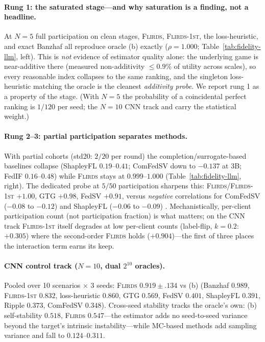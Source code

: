 \paragraph{Rung 1: the saturated stage---and why saturation is a finding, not a headline.}
At $N{=}5$ full participation on clean stages, \textsc{Flirds},
\textsc{Flirds-1st}, the loss-heuristic, and exact Banzhaf all reproduce oracle
(b) exactly ($\rho = 1.000$; Table~\ref{tab:fidelity-llm}, left). This is
\emph{not} evidence of estimator quality alone: the underlying game is
near-additive there (measured non-additivity $\le 0.9\%$ of utility across
scales), so every reasonable index collapses to the same ranking, and the
singleton loss-heuristic matching the oracle is the cleanest \emph{additivity
probe}. We report rung 1 as a property of the stage. (With $N{=}5$ the
probability of a coincidental perfect ranking is $1/120$ per seed; the $N{=}10$
CNN track and  carry the statistical
weight.)

\paragraph{Rung 2--3: partial participation separates methods.}
With partial cohorts (std20: $2/20$ per round) the completion/surrogate-based
baselines collapse (ShapleyFL $0.19$--$0.41$; ComFedSV down to $-0.137$ at 3B;
FedIF $0.16$--$0.48$) while \textsc{Flirds} stays at $0.999$--$1.000$
(Table~\ref{tab:fidelity-llm}, right). The dedicated probe at $5/50$
participation sharpens this: \textsc{Flirds}/\textsc{Flirds-1st} $+1.00$,
GTG $+0.98$, FedSV $+0.91$, versus \emph{negative} correlations for
ComFedSV ($-0.08$ to $-0.12$) and ShapleyFL ($-0.06$ to $-0.09$)
.
Mechanistically, per-client participation count (not participation fraction) is
what matters; on the CNN track \textsc{Flirds-1st} itself degrades at low
per-client counts (label-flip, $k{=}0.2$: $+0.305$) where the second-order
\textsc{Flirds} holds ($+0.904$)---the first of three places the interaction
term earns its keep.

\paragraph{CNN control track ($N{=}10$, dual $2^{10}$ oracles).}
Pooled over 10 scenarios $\times$ 3 seeds: \textsc{Flirds} $0.919\pm.134$ vs (b)
(Banzhaf $0.989$, \textsc{Flirds-1st} $0.832$, loss-heuristic $0.860$, GTG
$0.569$, FedSV $0.401$, ShapleyFL $0.391$, Ripple $0.373$, ComFedSV $0.348$).
Cross-seed stability tracks the oracle's own: (b) self-stability $0.518$,
\textsc{Flirds} $0.547$---the estimator adds no seed-to-seed variance beyond
the target's intrinsic instability---while MC-based methods add sampling
variance and fall to $0.124$--$0.311$.

